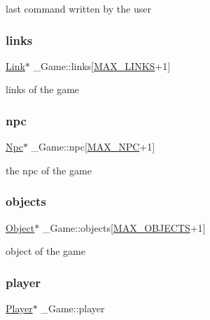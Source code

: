 last command written by the user \mbox{\label{struct__Game_a672f97aff892c65a6fdb43665cb57c97}} 
\subsubsection{\texorpdfstring{links}{links}}
{\footnotesize\ttfamily \hyperlink{link_8h_ae3b299941e67be6971bfd64a25505eff}{Link}$\ast$ \+\_\+\+Game\+::links\mbox{[}\hyperlink{link_8h_a660ed1ec8604982002a0d6eced0e0367}{M\+A\+X\+\_\+\+L\+I\+N\+KS}+1\mbox{]}}

links of the game \mbox{\label{struct__Game_a41e78cf09a2a3fc90d9f27c99bdf9d3c}} 
\subsubsection{\texorpdfstring{npc}{npc}}
{\footnotesize\ttfamily \hyperlink{npc_8h_a9529f25eaef52ee65aa84d4df6bb2d49}{Npc}$\ast$ \+\_\+\+Game\+::npc\mbox{[}\hyperlink{game_8c_a77f90fdf4bfbf2b0b6b5aded5458328d}{M\+A\+X\+\_\+\+N\+PC}+1\mbox{]}}

the npc of the game \mbox{\label{struct__Game_aa669bb857944c6c3b53504d179640af0}} 
\subsubsection{\texorpdfstring{objects}{objects}}
{\footnotesize\ttfamily \hyperlink{object_8h_a7f8bbcda919b65ce67f92fba08e0212f}{Object}$\ast$ \+\_\+\+Game\+::objects\mbox{[}\hyperlink{game_8h_acdc7844fbd4d45737d4aa56834d37829}{M\+A\+X\+\_\+\+O\+B\+J\+E\+C\+TS}+1\mbox{]}}

object of the game \mbox{\label{struct__Game_a31406605782d71ec00c4bf258ea76267}} 
\subsubsection{\texorpdfstring{player}{player}}
{\footnotesize\ttfamily \hyperlink{player_8h_af30e2030635a69690f85e48bc6ef202f}{Player}$\ast$ \+\_\+\+Game\+::player}

